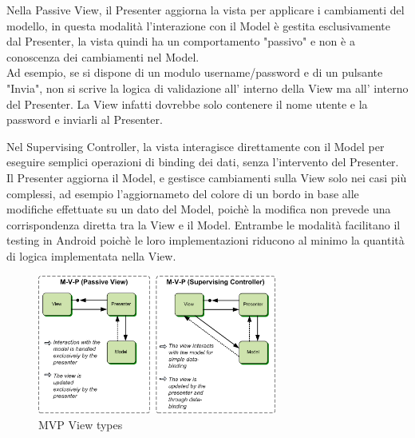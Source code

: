    Nella Passive View, il Presenter aggiorna la vista per applicare i cambiamenti del modello, in questa modalità l'interazione con il Model è gestita esclusivamente dal Presenter, la vista quindi ha un comportamento "passivo" e non è a conoscenza dei cambiamenti nel Model.\\
   Ad esempio, se si dispone di un modulo username/password e di un pulsante "Invia", non si scrive la logica di validazione all' interno della View ma all' interno del Presenter. La View infatti dovrebbe solo contenere il nome utente e la password e inviarli al Presenter.

   Nel Supervising Controller, la vista interagisce direttamente con il Model per eseguire semplici operazioni di binding dei dati, senza l'intervento del Presenter. Il Presenter aggiorna il Model, e gestisce cambiamenti sulla View solo nei casi più complessi, ad esempio l'aggiornameto del colore di un bordo in base alle modifiche effettuate su un dato del Model, poichè la modifica non prevede una corrispondenza diretta tra la View e il Model.
   Entrambe le modalità facilitano il testing in Android poichè le loro implementazioni riducono al minimo la quantità di logica implementata nella View.

   \begin{figure}[!hb]
     \centering
     \includegraphics[width=0.7\textwidth]{immagini/mvp_view_types.png}
     \caption{MVP View types}\label{fig:Model View Types}
   \end{figure}

